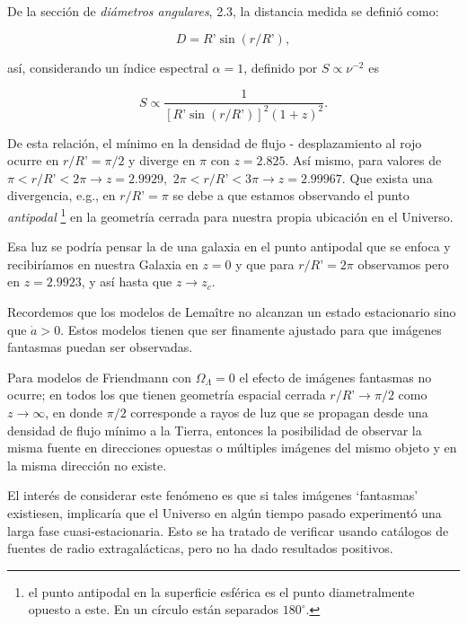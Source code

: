 \documentclass[11pt]{article}
\begin{document}
{    \newpage
    
    De la sección de {\textit{diámetros angulares}}, 2.3, la distancia medida se definió como:

\begin{equation}
	D = R’ \sin(r/R’),
\end{equation}
    
    así, considerando un índice espectral $\alpha = 1$, definido por $S \propto \nu^{-2}$ es

\begin{equation}
	S \propto	\frac{1}{[R’ \sin(r/R’)]^2 (1+z)^2}.
\end{equation}
     
     De esta relación, el mínimo en la densidad de flujo -  desplazamiento al rojo ocurre en $r/R’= \pi/2$ y diverge en $\pi$ con $z= 2.825$. Así mismo, para valores de $\pi < r/R’ < 2 \pi \rightarrow{z = 2.9929}, \, \, 2 \pi < r/R’ < 3 \pi \rightarrow{z = 2.99967}$. Que exista una divergencia, e.g., en $r/R’ = \pi$ se debe a que estamos observando el punto {\textit{antipodal}} {\footnote{el punto antipodal en la superficie esférica es el punto diametralmente opuesto a este. En un círculo están separados $180^{\circ}$. }} en la geometría cerrada para nuestra propia ubicación en el Universo.
    
   Esa luz se podría pensar  la de una galaxia en el punto antipodal que se enfoca y recibiríamos en nuestra Galaxia en $z=0$ y que para $r/R’ = 2  \pi$ observamos pero en $z=2.9923$, y así hasta que $z \rightarrow{z_c}$.  

Recordemos que los modelos de Lema\^itre no alcanzan un estado estacionario sino que $\dot{a} > 0$. Estos modelos tienen que ser finamente ajustado para que imágenes fantasmas puedan ser observadas. 

    
    Para modelos de Friendmann con $\Omega_{\Lambda} =0$ el efecto de imágenes fantasmas no ocurre; en todos los que tienen geometría espacial cerrada $r/R’ \rightarrow{\pi/2}$ como $z \rightarrow{\infty}$, en donde $\pi/2$ corresponde a rayos de luz que se propagan desde una densidad de flujo mínimo a la Tierra, entonces la posibilidad de observar la misma fuente en direcciones opuestas o múltiples imágenes del mismo objeto y en la misma dirección no existe. 
    
    El interés de considerar este fenómeno es que si tales imágenes `fantasmas’ existiesen, implicaría que el Universo en algún tiempo pasado experimentó una larga fase cuasi-estacionaria. Esto se ha tratado de verificar usando catálogos de fuentes de radio extragalácticas, pero no ha dado resultados positivos. 



}
\end{document}

